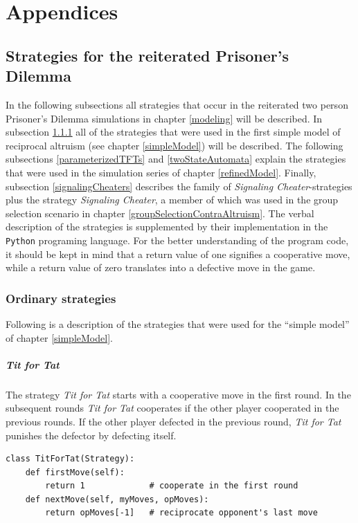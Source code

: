 \chapter{Appendices}

\section{Strategies for the reiterated Prisoner's Dilemma}

In the following subsections all strategies that occur in the reiterated two
person Prisoner's Dilemma simulations in chapter \ref{modeling} will be
described. In subsection \ref{ordinaryStrategies} all of the strategies that
were used in the first simple model of reciprocal altruism (see chapter
\ref{simpleModel}) will be described. The following subsections
\ref{parameterizedTFTs} and \ref{twoStateAutomata} explain the strategies that
were used in the simulation series of chapter \ref{refinedModel}. Finally,
subsection \ref{signalingCheaters} describes the family of {\em Signaling
  Cheater}-strategies plus the strategy {\em Signaling Cheater}, a member of
which was used in the group selection scenario in chapter
\ref{groupSelectionContraAltruism}. The verbal description of the strategies
is supplemented by their implementation in the {\tt Python} programing
language. For the better understanding of the program code, it should be kept
in mind that a return value of one signifies a cooperative move, while a
return value of zero translates into a defective move in the game.

\subsection{Ordinary strategies}
\label{ordinaryStrategies}

Following is a description of the strategies that were used for the ``simple
model'' of chapter \ref{simpleModel}.

\paragraph{Tit for Tat} The strategy {\em Tit for Tat} starts with a
cooperative move in the first round. In the subsequent rounds {\em Tit for
Tat} cooperates if the other player cooperated in the previous rounds. If the
other player defected in the previous round, {\em Tit for Tat} punishes the
defector by defecting itself.
\begin{scriptsize}
\begin{verbatim}
class TitForTat(Strategy):
    def firstMove(self):
        return 1             # cooperate in the first round
    def nextMove(self, myMoves, opMoves):
        return opMoves[-1]   # reciprocate opponent's last move
\end{verbatim}
\end{scriptsize}

